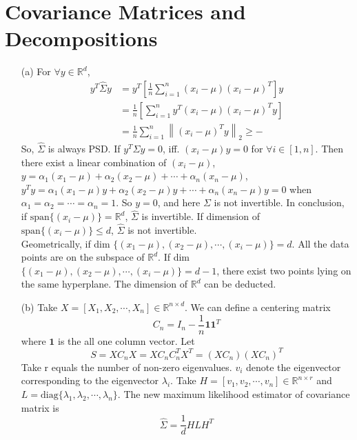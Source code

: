 \documentclass[a4paper,12pt]{article}
\begin{document}
\section{Covariance Matrices and Decompositions}
\begin{itemize}
\item[(a)]
For $\forall y \in \mathbb{R}^d$,
\begin{align*}
y^T \hat \Sigma y 
&= y^T \left [ \frac{1}{n} \sum_{i=1}^n (x_i - \mu)(x_i - \mu)^T \right ] y \\
&=  \frac{1}{n} \left [  \sum_{i=1}^n y^T (x_i - \mu)(x_i - \mu)^T y \right ]  \\
&= \frac{1}{n} \sum_{i=1}^n \left \| (x_i - \mu)^T y \right \|_2 \ge -
\end{align*}
So, $\hat \Sigma$ is always PSD. If $y^T \hat \Sigma y = 0$, iff. $(x_i - \mu) y= 0$ for $\forall i \in [1,n]$. Then there exist a linear combination of $(x_i - \mu)$, $y = \alpha_1 (x_1 - \mu) + \alpha_2 (x_2 - \mu) + \cdots + \alpha_n (x_n - \mu)$, $y^T y =\alpha_1 (x_1 - \mu) y + \alpha_2 (x_2 - \mu) y+ \cdots + \alpha_n (x_n - \mu) y = 0$ when $\alpha_1 = \alpha_2 = \cdots = \alpha_n = 1$. So $y = 0$, and here $\Sigma$ is not invertible. In conclusion, if $\text{span} \{ (x_i - \mu)\} = \mathbb{R}^d$, $\hat \Sigma$ is invertible. If dimension of $\text{span} \{ (x_i - \mu)\} \le d$, $\hat \Sigma$ is not invertible. \\

Geometrically, if dim $\{ (x_1 - \mu), (x_2 - \mu), \cdots, (x_i - \mu)\} = d$. All the data points are on the subspace of $\mathbb{R}^d$. If dim $\{ (x_1 - \mu), (x_2 - \mu), \cdots, (x_i - \mu)\} = d - 1$, there exist two points lying on the same hyperplane. The dimension of $\mathbb{R}^d$ can be deducted.

\clearpage
\item[(b)]
Take $X = [X_1, X_2, \cdots, X_n] \in \mathbb{R}^{n \times d}$. We can define a centering matrix
$$
C_n = I_n - \frac{1}{n} \textbf{1} \textbf{1}^T
$$
where $\textbf{1}$ is the all one column vector. Let
$$
S = X C_n X = X C_n C_n^T X^T = (X C_n) (X C_n)^T
$$
Take r equals the number of non-zero eigenvalues. $v_i$ denote the eigenvector corresponding to the eigenvector $\lambda_i$.
Take $H = [v_1, v_2, \cdots, v_n] \in \mathbb{R}^{n \times r} $ and $L = \text{diag} \{ \lambda_1, \lambda_2, \cdots, \lambda_n\}$. The new maximum likelihood estimator of covariance matrix is
$$
\hat \Sigma = \frac{1}{d} H L H^T
$$


\end{itemize}
\end{document}

